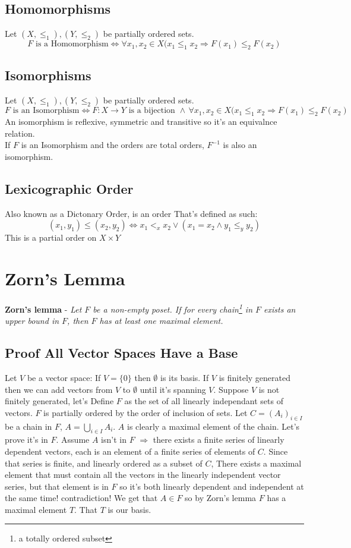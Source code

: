 \documentclass{article}
\begin{document}
  \subsection{Homomorphisms}
  Let $(X,\le_1) , (Y,\le_2)$ be partially ordered sets.
\[F \text{ is a Homomorphism} \iff \forall x_1,x_2 \in X(x_1 \le_1 x_2 \Rightarrow F(x_1)\le_2 F(x_2)\]

	\subsection{Isomorphisms}
	  Let $(X,\le_1) , (Y,\le_2)$ be partially ordered sets.
	\[F \text{ is an Isomorphism} \iff F:X\rightarrow Y \text{ is a bijection } \land\, \forall x_1,x_2 \in X(x_1 \le_1 x_2 \Rightarrow F(x_1)\le_2 F(x_2)\]
	An isomorphism is reflexive, symmetric and transitive so it's an equivalnce relation.\\
	If $F$ is an Isomorphism and the orders are total orders, $F^{-1}$ is also an isomorphism.
	
	\subsection{Lexicographic Order}
	Also known as a Dictonary Order, is an order That's defined as such:
\[(x_1,y_1)\le(x_2,y_2) \iff x_1 <_{x} x_2 \lor (x_1=x_2 \land y_1 \le_{y} y_2)\]
This is a partial order on $X\times Y$

\newpage
\section{Zorn's Lemma}
\textbf{Zorn's lemma} - \emph{Let $F$ be a non-empty poset.
If for every chain\footnote{a totally ordered subset} in $F$ exists an upper bound in $F$, then $F$ has at least one maximal element.}
\subsection{Proof All Vector Spaces Have a Base}
Let $V$ be a vector space: If $V=\{0\}$ then $\emptyset$ is its basis. If $V$ is finitely generated then we can add vectors from $V$ to $\emptyset$ until it's spanning $V$.
Suppose $V$ is not finitely generated, let's Define $F$ as the set of all linearly independant sets of vectors.
$F$ is partially ordered by the order of inclusion of sets.
Let $C=(A_i)_{i\in I}$ be a chain in $F$, $A=\bigcup_{i\in I}A_i$. $A$ is clearly a maximal element of the chain. Let's prove it's in $F$.
Assume $A$ isn't in $F$ $\Rightarrow$ there exists a finite series of linearly dependent vectors, each is an element of a finite series of elements of $C$. Since that series is finite, and linearly ordered as a subset of $C$, There exists a maximal element that must contain all the vectors in the linearly independent vector series, but that element is in $F$ so it's both linearly dependent and independent at the same time! contradiction! We get that $A\in F$ so by Zorn's lemma $F$ has a maximal element $T$. That $T$ is our basis.
\end{document}
